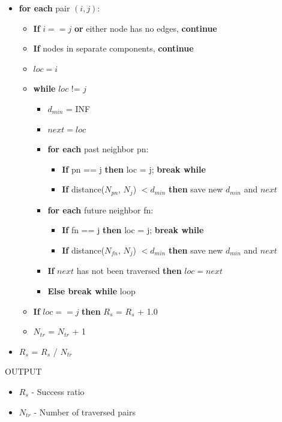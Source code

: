 \documentclass[preprint,notitlepage,amsmath,amssymb,floatfix]{revtex4-1}
\begin{document}
\begin{itemize}[leftmargin=*]
  \item [] \textbf{for each} pair $(i,j)$:
  \begin{itemize}[leftmargin=*]
    \item [] \textbf{If} $i == j$ \textbf{or} either node has no edges, \textbf{continue}
    \item [] \textbf{If} nodes in separate components, \textbf{continue}
    \item [] $loc = i$
    \item [] \textbf{while} $loc$ != $j$
    \begin{itemize}[leftmargin=*]
      \item [] $d_{min}$ = INF
      \item [] $next = loc$
      \item [] \textbf{for each} past neighbor pn:
      \begin{itemize}[leftmargin=*]
        \item [] \textbf{If} pn == j \textbf{then} loc = j; \textbf{break while}
        \item [] \textbf{If} distance($N_{pn}$, $N_j$) $< d_{min}$ \textbf{then} save new $d_{min}$ and $next$
      \end{itemize}
      \item [] \textbf{for each} future neighbor fn:
      \begin{itemize}[leftmargin=*]
        \item [] \textbf{If} fn == j \textbf{then} loc = j; \textbf{break while}
        \item [] \textbf{If} distance($N_{fn}$, $N_j$) $< d_{min}$ \textbf{then} save new $d_{min}$ and $next$
      \end{itemize}
      \item [] \textbf{If} $next$ has not been traversed \textbf{then} $loc = next$
      \item [] \textbf{Else break while} loop
    \end{itemize}
    \item [] \textbf{If} $loc == j$ \textbf{then} $R_s$ = $R_s$ + 1.0
    \item [] $N_{tr}$ = $N_{tr}$ + 1
  \end{itemize}
  \item [] $R_s$ = $R_s$ / $N_{tr}$
\end{itemize}
\begin{description}
  \item[OUTPUT]
\end{description}
\begin{itemize}[leftmargin=*]
  \item $R_s$ - Success ratio
  \item $N_{tr}$ - Number of traversed pairs
\end{itemize}
\end{document}
